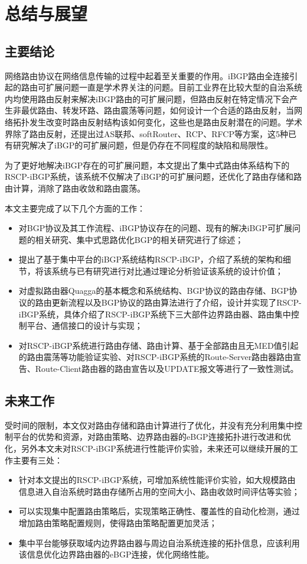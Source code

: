 \chapter{总结与展望}
\label{cha:summary}



\section{主要结论}
网络路由协议在网络信息传输的过程中起着至关重要的作用。iBGP路由全连接引起的路由可扩展问题一直是学术界关注的问题。目前工业界在比较大型的自治系统内均使用路由反射来解决iBGP路由的可扩展问题，但路由反射在特定情况下会产生非最优路由、转发环路、路由震荡等问题，如何设计一个合适的路由反射，当网络拓扑发生改变时路由反射结构该如何变化，这些也是路由反射潜在的问题。学术界除了路由反射，还提出过AS联邦、softRouter、RCP、RFCP等方案，这5种已有研究解决了iBGP的可扩展问题，但是仍存在不同程度的缺陷和局限性。

为了更好地解决iBGP存在的可扩展问题，本文提出了集中式路由体系结构下的RSCP-iBGP系统，该系统不仅解决了iBGP的可扩展问题，还优化了路由存储和路由计算，消除了路由收敛和路由震荡。

本文主要完成了以下几个方面的工作：
\begin{itemize}
  \item 对BGP协议及其工作流程、iBGP协议存在的问题、现有的解决iBGP可扩展问题的相关研究、集中式思路优化BGP的相关研究进行了综述；
  \item 提出了基于集中平台的iBGP系统结构RSCP-iBGP，介绍了系统的架构和细节，将该系统与已有研究进行对比通过理论分析验证该系统的设计价值；
  \item 对虚拟路由器Quagga的基本概念和系统结构、BGP协议的路由存储、BGP协议的路由更新流程以及BGP协议的路由算法进行了介绍，设计并实现了RSCP-iBGP系统，具体介绍了RSCP-iBGP系统下三大部件边界路由器、路由集中控制平台、通信接口的设计与实现；
  \item 对RSCP-iBGP系统进行路由存储、路由计算、基于全部路由且无MED值引起的路由震荡等功能验证实验、对RSCP-iBGP系统的Route-Server路由器路由宣告、Route-Client路由器的路由宣告以及UPDATE报文等进行了一致性测试。
\end{itemize}


\section{未来工作}

受时间的限制，本文仅对路由存储和路由计算进行了优化，并没有充分利用集中控制平台的优势和资源，对路由策略、边界路由器的eBGP连接拓扑进行改进和优化，另外本文未对RSCP-iBGP系统进行性能评价实验，未来还可以继续开展的工作主要有三处：

\begin{itemize}
  \item 针对本文提出的RSCP-iBGP系统，可增加系统性能评价实验，如大规模路由信息进入自治系统时路由存储所占用的空间大小、路由收敛时间评估等实验；
  \item 可以实现集中配置路由策略后，实现策略正确性、覆盖性的自动化检测，通过增加路由策略配置规则，使得路由策略配置更加灵活；
  \item 集中平台能够获取域内边界路由器与周边自治系统连接的拓扑信息，应该利用该信息优化边界路由器的eBGP连接，优化网络性能。
\end{itemize} 